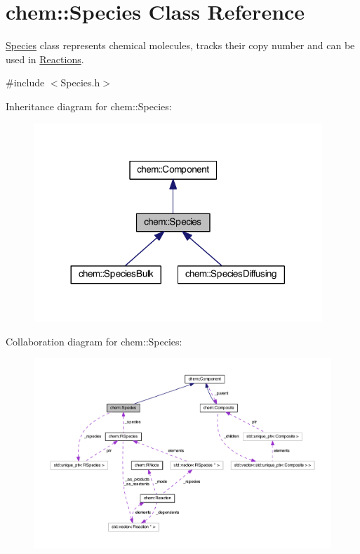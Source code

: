 \hypertarget{classchem_1_1Species}{\section{chem\-:\-:Species Class Reference}
\label{classchem_1_1Species}
}


\hyperlink{classchem_1_1Species}{Species} class represents chemical molecules, tracks their copy number and can be used in \hyperlink{classchem_1_1Reaction}{Reactions}.  




{\ttfamily \#include $<$Species.\-h$>$}



Inheritance diagram for chem\-:\-:Species\-:\nopagebreak
\begin{figure}[H]
\begin{center}
\leavevmode
\includegraphics[width=308pt]{classchem_1_1Species__inherit__graph}
\end{center}
\end{figure}


Collaboration diagram for chem\-:\-:Species\-:\nopagebreak
\begin{figure}[H]
\begin{center}
\leavevmode
\includegraphics[width=350pt]{classchem_1_1Species__coll__graph}
\end{center}
\end{figure}
